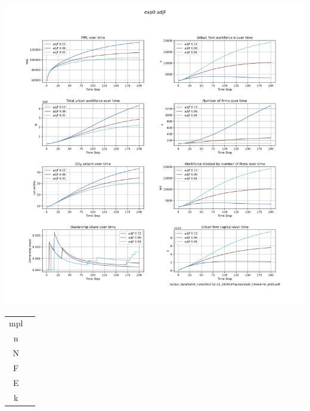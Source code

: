 \documentclass{article}
\begin{document}
\includegraphics[scale=.75]{fig/Analysis/2023-12-13-91942-timeseries-plots.png}

\newpage



\begin{tabular}{c|c}
  mpl  &  \\
  n   &  \\
  N   &  \\
  F   &  \\
  E   &  \\
  k   & 
\end{tabular} 



\end{document}
